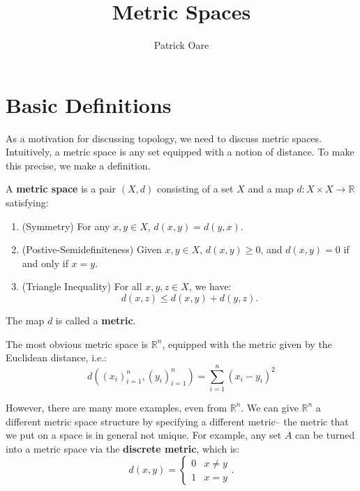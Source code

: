 \def \root {../../}			%


\newcommand{\Cau}{\mathrm{Cau}}

\title{Metric Spaces}
\author{Patrick Oare}
\date{}							%


\maketitle

\section{Basic Definitions}

	As a motivation for discussing topology, we need to discuss metric spaces. Intuitively, a metric space is any set equipped with a notion of distance. To make 
	this precise, we make a definition.
	
	\begin{definition}
	A \textbf{metric space} is a pair $(X, d)$ consisting of a set $X$ and a map $d : X\times X\rightarrow\mathbb R$ satisfying:
	\begin{enumerate}
		\item (Symmetry) For any $x, y\in X$, $d(x, y) = d(y, x)$.
		\item (Postive-Semidefiniteness) Given $x, y\in X$, $d(x, y) \geq 0$, and $d(x, y) = 0$ if and only if $x = y$.
		\item (Triangle Inequality) For all $x, y, z\in X$, we have:
		\begin{equation}
			d(x, z)\leq d(x, y) + d(y, z).
		\end{equation}
	\end{enumerate}
	The map $d$ is called a \textbf{metric}.
	\end{definition}
	
	The most obvious metric space is $\mathbb R^n$, equipped with the metric given by the Euclidean distance, i.e.:
	\begin{equation}
		d((x_i)_{i = 1}^n, (y_i)_{i = 1}^n) = \sum_{i = 1}^n (x_i - y_i)^2
	\end{equation}
	
	However, there are many more examples, even from $\mathbb R^n$. We can give $\mathbb R^n$ a different metric space structure by specifying a 
	different metric-- the metric that we put on a space is in general not unique. For example, any set $A$ can be turned into a metric space via the 
	\textbf{discrete metric}, which is:
	\begin{equation}
		d(x, y) = 
		\begin{cases}
			0 & x\neq y \\
			1 & x = y
		\end{cases}.
	\end{equation}


